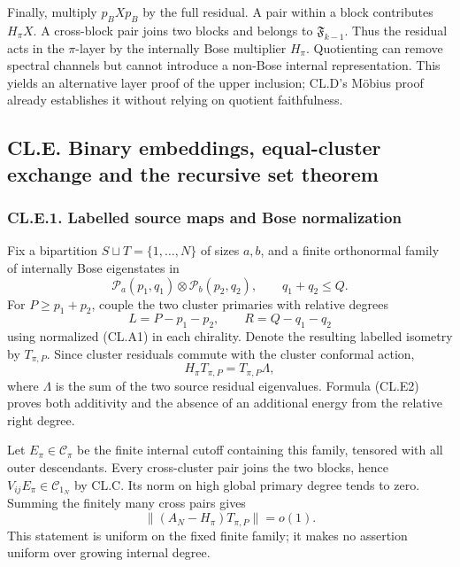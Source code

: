 Finally, multiply \(p_BXp_B\) by the full residual. A pair within a block contributes \(H_\pi X\). A cross-block pair joins two blocks and belongs to \(\mathfrak F_{k-1}\). Thus the residual acts in the \(\pi\)-layer by the internally Bose multiplier \(H_\pi\). Quotienting can remove spectral channels but cannot introduce a non-Bose internal representation. This yields an alternative layer proof of the upper inclusion; CL.D's Möbius proof already establishes it without relying on quotient faithfulness.

\hypertarget{cl.e.-binary-embeddings-equal-cluster-exchange-and-the-recursive-set-theorem}{%
\subsection{CL.E. Binary embeddings, equal-cluster exchange and the recursive set theorem}\label{cl.e.-binary-embeddings-equal-cluster-exchange-and-the-recursive-set-theorem}}

\hypertarget{cl.e.1.-labelled-source-maps-and-bose-normalization}{%
\subsubsection{CL.E.1. Labelled source maps and Bose normalization}\label{cl.e.1.-labelled-source-maps-and-bose-normalization}}

Fix a bipartition \(S\sqcup T=\{1,\ldots,N\}\) of sizes \(a,b\), and a finite orthonormal family of internally Bose eigenstates in \[
\mathcal P_a(p_1,q_1)\otimes\mathcal P_b(p_2,q_2),
\qquad q_1+q_2\leq Q.
\] For \(P\geq p_1+p_2\), couple the two cluster primaries with relative degrees \[
L=P-p_1-p_2,\qquad R=Q-q_1-q_2
\tag{CL.E1}
\] using normalized (CL.A1) in each chirality. Denote the resulting labelled isometry by \(T_{\pi,P}\). Since cluster residuals commute with the cluster conformal action, \[
H_\pi T_{\pi,P}=T_{\pi,P}\Lambda,
\tag{CL.E2}
\] where \(\Lambda\) is the sum of the two source residual eigenvalues. Formula (CL.E2) proves both additivity and the absence of an additional energy from the relative right degree.

Let \(E_\pi\in\mathcal C_\pi\) be the finite internal cutoff containing this family, tensored with all outer descendants. Every cross-cluster pair joins the two blocks, hence \(V_{ij}E_\pi\in\mathcal C_{1_N}\) by CL.C. Its norm on high global primary degree tends to zero. Summing the finitely many cross pairs gives \[
\|(A_N-H_\pi)T_{\pi,P}\|=o(1).
\tag{CL.E3}
\] This statement is uniform on the fixed finite family; it makes no assertion uniform over growing internal degree.

